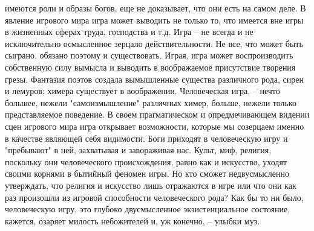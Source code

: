 \documentclass[12pt]{article}
\begin{document}
имеются роли и образы богов, еще не доказывает, что они есть на самом деле. В явление игрового мира игра
может выводить не только то, что имеется вне игры в жизненных сферах труда, господства и т.д. Игра -- не
всегда и не исключительно осмысленное зерцало действительности. Не все, что может быть сыграно, обязано
поэтому  и  существовать.  Играя,  игра  может  воспроизводить  собственную  силу  вымысла  и  выводить  в
воображаемое присутствие творения грезы. Фантазия поэтов создала вымышленные существа различного рода,
сирен  и  лемуров;  химера  существует  в  воображении.  Человеческая  игра,  --  нечто  большее,  нежели
"самоизмышление"  различных  химер,  больше,  нежели  только  представляемое  поведение.  В  своем
прагматическом и опредмечивающем видении сцен игрового мира игра открывает возможности, которые мы
созерцаем именно в качестве являющей себя видимости. Боги приходят в человеческую игру и "пребывают" в
ней, захватывая и завораживая нас. Культ, миф, религия, поскольку они человеческого происхождения, равно
как  и  искусство,  уходят  своими  корнями  в  бытийный  феномен  игры.  Но  кто  сможет  недвусмысленно
утверждать, что религия и искусство лишь отражаются в игре или что они как раз произошли из игровой
способности  человеческого  рода?  Как  бы  то  ни  было,  человеческую  игру,  это  глубоко  двусмысленное
экзистенциальное состояние, кажется, озаряет милость небожителей и, уж конечно, -- улыбки муз.

\newpage
\end{document}
